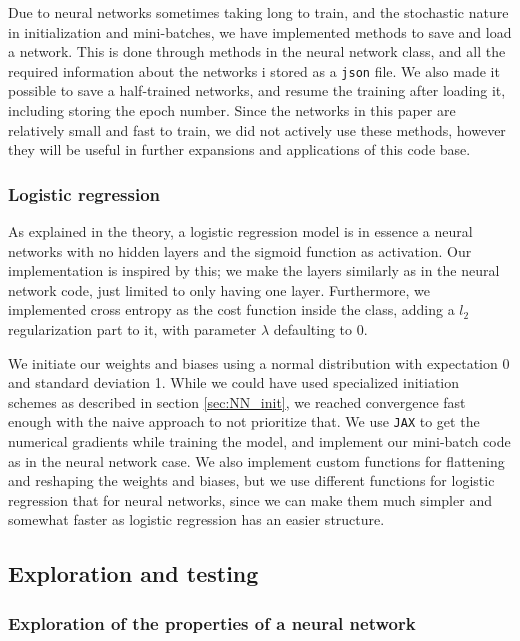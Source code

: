 Due to neural networks sometimes taking long to train, and the stochastic nature in initialization and mini-batches, we have implemented methods to save and load a network.
This is done through methods in the neural network class, and all the required information about the networks i stored as a \texttt{json} file.
We also made it possible to save a half-trained networks, and resume the training after loading it, including storing the epoch number.
Since the networks in this paper are relatively small and fast to train, we did not actively use these methods, however they will be useful in further expansions and applications of this code base.

\subsubsection{Logistic regression}

As explained in the theory, a logistic regression model is in essence a neural networks with no hidden layers and the sigmoid function as activation.
Our implementation is inspired by this; we make the layers similarly as in the neural network code, just limited to only having one layer.
Furthermore, we implemented cross entropy as the cost function inside the class, adding a $l_2$ regularization part to it, with parameter $\lambda$ defaulting to 0.

We initiate our weights and biases using a normal distribution with expectation 0 and standard deviation 1.
While we could have used specialized initiation schemes as described in section \ref{sec:NN_init}, we reached convergence fast enough with the naive approach to not prioritize that.
We use \texttt{JAX} \cite{jax2018github} to get the numerical gradients while training the model, and implement our mini-batch code as in the neural network case.
We also implement custom functions for flattening and reshaping the weights and biases, but we use different functions for logistic regression that for neural networks, since we can make them much simpler and somewhat faster as logistic regression has an easier structure.

\subsection{Exploration and testing}
\subsubsection{Exploration of the properties of a neural network}

